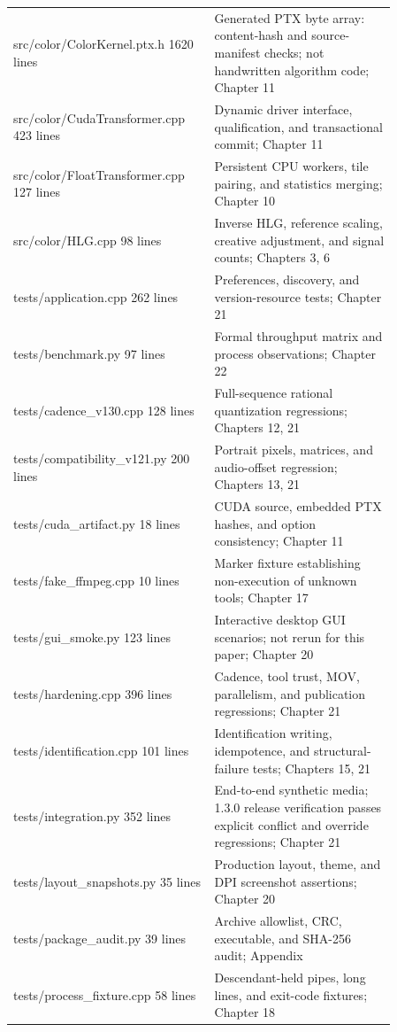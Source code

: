 \documentclass[11pt,a4paper,openany]{book}
\begin{document}
\begin{longtable}{p{0.43\linewidth}p{0.43\linewidth}}
src/color/ColorKernel.ptx.h
1620 lines & Generated PTX byte array: content-hash and source-manifest checks; not handwritten algorithm code; Chapter 11\\
src/color/CudaTransformer.cpp
423 lines & Dynamic driver interface, qualification, and transactional commit; Chapter 11\\
src/color/FloatTransformer.cpp
127 lines & Persistent CPU workers, tile pairing, and statistics merging; Chapter 10\\
src/color/HLG.cpp
98 lines & Inverse HLG, reference scaling, creative adjustment, and signal counts; Chapters 3, 6\\
tests/application.cpp
262 lines & Preferences, discovery, and version-resource tests; Chapter 21\\
tests/benchmark.py
97 lines & Formal throughput matrix and process observations; Chapter 22\\
tests/cadence\_v130.cpp
128 lines & Full-sequence rational quantization regressions; Chapters 12, 21\\
tests/compatibility\_v121.py
200 lines & Portrait pixels, matrices, and audio-offset regression; Chapters 13, 21\\
tests/cuda\_artifact.py
18 lines & CUDA source, embedded PTX hashes, and option consistency; Chapter 11\\
tests/fake\_ffmpeg.cpp
10 lines & Marker fixture establishing non-execution of unknown tools; Chapter 17\\
tests/gui\_smoke.py
123 lines & Interactive desktop GUI scenarios; not rerun for this paper; Chapter 20\\
tests/hardening.cpp
396 lines & Cadence, tool trust, MOV, parallelism, and publication regressions; Chapter 21\\
tests/identification.cpp
101 lines & Identification writing, idempotence, and structural-failure tests; Chapters 15, 21\\
tests/integration.py
352 lines & End-to-end synthetic media; 1.3.0 release verification passes explicit conflict and override regressions; Chapter 21\\
tests/layout\_snapshots.py
35 lines & Production layout, theme, and DPI screenshot assertions; Chapter 20\\
tests/package\_audit.py
39 lines & Archive allowlist, CRC, executable, and SHA-256 audit; Appendix\\
tests/process\_fixture.cpp
58 lines & Descendant-held pipes, long lines, and exit-code fixtures; Chapter 18\\

\end{longtable}
\end{document}

